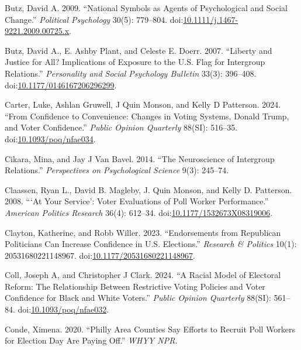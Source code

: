\documentclass[
  12pt,
  letterpaper,
]{article}
\newlength{\cslhangindent}
\newenvironment{CSLReferences}[2] %
 {\begin{list}{}{%
  \setlength{\itemindent}{0pt}
  \setlength{\leftmargin}{0pt}
  \setlength{\parsep}{0pt}
  \ifodd #1
   \setlength{\leftmargin}{\cslhangindent}
   \setlength{\itemindent}{-1\cslhangindent}
  \fi
  \setlength{\itemsep}{#2\baselineskip}}}
 {\end{list}}
\begin{document}
\begin{CSLReferences}{1}{1}
Butz, David A. 2009. {``National {Symbols} as {Agents} of
{Psychological} and {Social Change}.''} \emph{Political Psychology}
30(5): 779--804.
doi:\href{https://doi.org/10.1111/j.1467-9221.2009.00725.x}{10.1111/j.1467-9221.2009.00725.x}.

Butz, David A., E. Ashby Plant, and Celeste E. Doerr. 2007. {``Liberty
and {Justice} for {All}? {Implications} of {Exposure} to the {U}.{S}.
{Flag} for {Intergroup Relations}.''} \emph{Personality and Social
Psychology Bulletin} 33(3): 396--408.
doi:\href{https://doi.org/10.1177/0146167206296299}{10.1177/0146167206296299}.

Carter, Luke, Ashlan Gruwell, J Quin Monson, and Kelly D Patterson.
2024. {``From {Confidence} to {Convenience}: {Changes} in {Voting
Systems}, {Donald Trump}, and {Voter Confidence}.''} \emph{Public
Opinion Quarterly} 88(SI): 516--35.
doi:\href{https://doi.org/10.1093/poq/nfae034}{10.1093/poq/nfae034}.

Cikara, Mina, and Jay J Van Bavel. 2014. {``The {Neuroscience} of
{Intergroup Relations}.''} \emph{Perspectives on Psychological Science}
9(3): 245--74.

Claassen, Ryan L., David B. Magleby, J. Quin Monson, and Kelly D.
Patterson. 2008. {``{`{At Your Service}'}: {Voter Evaluations} of {Poll
Worker Performance}.''} \emph{American Politics Research} 36(4):
612--34.
doi:\href{https://doi.org/10.1177/1532673X08319006}{10.1177/1532673X08319006}.

Clayton, Katherine, and Robb Willer. 2023. {``Endorsements from
{Republican} Politicians Can Increase Confidence in {U}.{S}.
Elections.''} \emph{Research \& Politics} 10(1): 20531680221148967.
doi:\href{https://doi.org/10.1177/20531680221148967}{10.1177/20531680221148967}.

Coll, Joseph A, and Christopher J Clark. 2024. {``A {Racial Model} of
{Electoral Reform}: {The Relationship} Between {Restrictive Voting
Policies} and {Voter Confidence} for {Black} and {White Voters}.''}
\emph{Public Opinion Quarterly} 88(SI): 561--84.
doi:\href{https://doi.org/10.1093/poq/nfae032}{10.1093/poq/nfae032}.

Conde, Ximena. 2020. {``Philly Area Counties Say Efforts to Recruit Poll
Workers for {Election Day} Are Paying Off.''} \emph{WHYY NPR}.


\end{CSLReferences}
\end{document}

